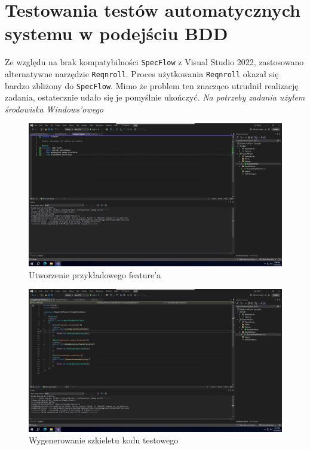 \documentclass[12pt]{article}
\begin{document}
\section{Testowania testów automatycznych systemu w podejściu BDD}
\begin{description}
  \item{Ze względu na brak kompatybilności \texttt{SpecFlow} z Visual Studio 2022, zastosowano alternatywne narzędzie \texttt{Reqnroll}. Proces użytkowania \texttt{Reqnroll} okazał się bardzo zbliżony do \texttt{SpecFlow}. Mimo że problem ten znacząco utrudnił realizację zadania, ostatecznie udało się je pomyślnie ukończyć.}
        \textit{Na potrzeby zadania użyłem środowiska Windows'owego}

\end{description}
\begin{figure}[H]
  \centering
  \includegraphics[width=1\textwidth,keepaspectratio]{image-23.png}
  \caption{Utworzenie przykładowego feature'a}
  \label{fig:image-23}
\end{figure}
\begin{figure}[H]
  \centering
  \includegraphics[width=1\textwidth,keepaspectratio]{image-24.png}
  \caption{Wygenerowanie szkieletu kodu testowego}
  \label{fig:image-24}
\end{figure}
\end{document}
